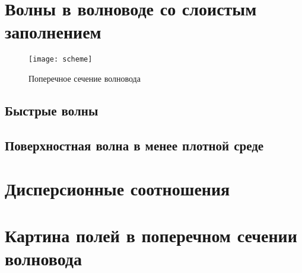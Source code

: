 \documentclass[12pt]{hedsemwork}
\begin{document}
\maketitle
\section{Волны в волноводе со слоистым заполнением}
\begin{figure}[h]
    \center
    \texttt{[image: scheme]}
    \caption{Поперечное сечение волновода}
\end{figure}
\subsection{Быстрые волны}

\subsection{Поверхностная волна в менее плотной среде}

\section{Дисперсионные соотношения}

\pagebreak
\section{Картина полей в поперечном сечении волновода}

\end{document}
